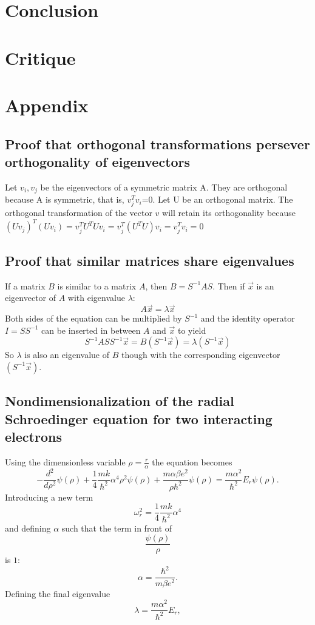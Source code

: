 \documentclass[10pt,a4paper]{article}
\begin{document}
\section{Conclusion}

\section{Critique}

\section{Appendix}
\subsection{Proof that orthogonal transformations persever orthogonality of eigenvectors}\label{eigenvector orthogonality}
Let $v_i, v_j$ be the eigenvectors of a symmetric matrix A. They are orthogonal because A is symmetric, that is, $v_{j}^Tv_i$=0. Let U be an orthogonal matrix. The orthogonal transformation of the vector $v$ will retain its orthogonality because
 $(Uv_j)^T(Uv_i)=v_{j}^TU^TUv_i=v_{j}^T(U^TU)v_i=v_{j}^Tv_i=0$
\subsection{Proof that similar matrices share eigenvalues}\label{proof of same eigenvalues}
If a matrix $B$ is similar to a matrix $A$, then $B=S^{-1}AS$. Then if $\vec{x}$ is an eigenvector of $A$ with eigenvalue $\lambda$:
$$
A\vec{x}=\lambda\vec{x}
$$
Both sides of the equation can be multiplied by $S^{-1}$ and the identity operator $I = SS^{-1}$ can be inserted in between $A$ and $\vec{x}$ to yield
$$
S^{-1}ASS^{-1}\vec{x} =B\left(S^{-1}\vec{x}\right)= \lambda \left( S^{-1}\vec{x}\right)
$$
So $\lambda$ is also an eigenvalue of $B$ though with the corresponding eigenvector $\left( S^{-1}\vec{x}\right)$.
\subsection{Nondimensionalization of the radial Schroedinger equation for two interacting electrons}
\label{nondim_2_el}
Using the dimensionless variable $\rho=\frac{r}{\alpha}$ the equation becomes
\begin{equation*}
  -\frac{d^2}{d\rho^2} \psi(\rho) 
       + \frac{1}{4}\frac{mk}{\hbar^2} \alpha^4\rho^2\psi(\rho)+\frac{m\alpha \beta e^2}{\rho\hbar^2}\psi(\rho)  = 
\frac{m\alpha^2}{\hbar^2}E_r \psi(\rho) .
\end{equation*}
Introducing a new term 
$$
\omega_r^2=\frac{1}{4}\frac{mk}{\hbar^2} \alpha^4
$$
and defining $\alpha$ such that the term in front of 
$$
\frac{\psi(\rho)}{\rho}
$$
is $1$:
\begin{equation*}
\alpha = \frac{\hbar^2}{m\beta e^2}.
\end{equation*}
Defining the final eigenvalue
\begin{equation*}
\lambda = \frac{m\alpha^2}{\hbar^2}E_r,
\end{equation*}
\end{document}
